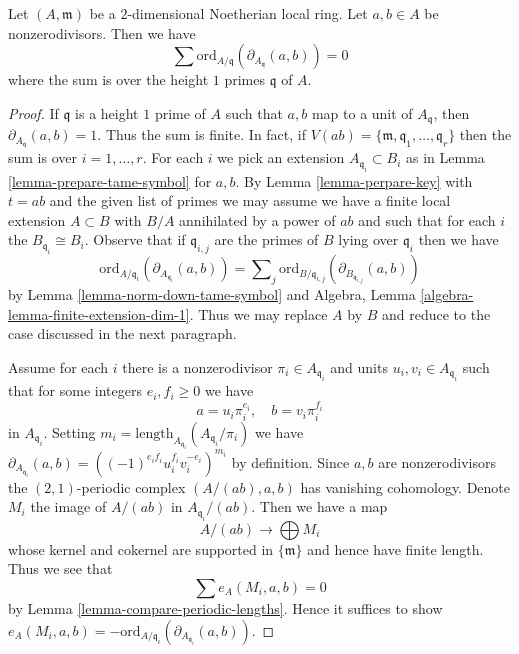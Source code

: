 \begin{lemma}
\label{lemma-key-nonzerodivisors}
Let $(A, \mathfrak m)$ be a $2$-dimensional Noetherian local ring.
Let $a, b \in A$ be nonzerodivisors.
Then we have
$$
\sum
\text{ord}_{A/\mathfrak q}(\partial_{A_{\mathfrak q}}(a, b))
=
0
$$
where the sum is over the height $1$ primes $\mathfrak q$ of $A$.
\end{lemma}

\begin{proof}
If $\mathfrak q$ is a height $1$ prime of $A$ such that $a, b$
map to a unit of $A_\mathfrak q$, then $\partial_{A_\mathfrak q}(a, b) = 1$.
Thus the sum is finite. In fact, if
$V(ab) = \{\mathfrak m, \mathfrak q_1, \ldots, \mathfrak q_r\}$
then the sum is over $i = 1, \ldots, r$.
For each $i$ we pick an extension $A_{\mathfrak q_i} \subset B_i$
as in Lemma \ref{lemma-prepare-tame-symbol} for $a, b$.
By Lemma \ref{lemma-perpare-key} with $t = ab$ and the given list of primes
we may assume we have a finite local extension $A \subset B$
with $B/A$ annihilated by a power of $ab$ and such that
for each $i$ the $B_{\mathfrak q_i} \cong B_i$.
Observe that if $\mathfrak q_{i, j}$ are the primes of $B$
lying over $\mathfrak q_i$ then we have
$$
\text{ord}_{A/\mathfrak q_i}(\partial_{A_{\mathfrak q_i}}(a, b))
=
\sum\nolimits_j
\text{ord}_{B/\mathfrak q_{i, j}}(\partial_{B_{\mathfrak q_{i, j}}}(a, b))
$$
by Lemma \ref{lemma-norm-down-tame-symbol} and
Algebra, Lemma \ref{algebra-lemma-finite-extension-dim-1}.
Thus we may replace $A$ by $B$ and
reduce to the case discussed in the next paragraph.

\medskip\noindent
Assume for each $i$ there is a nonzerodivisor
$\pi_i \in A_{\mathfrak q_i}$ and units $u_i, v_i \in A_{\mathfrak q_i}$
such that for some integers $e_i, f_i \geq 0$ we have
$$
a = u_i \pi_i^{e_i},\quad b = v_i \pi_i^{f_i}
$$
in $A_{\mathfrak q_i}$. Setting
$m_i = \text{length}_{A_{\mathfrak q_i}}(A_{\mathfrak q_i}/\pi_i)$
we have
$\partial_{A_{\mathfrak q_i}}(a, b) =
((-1)^{e_if_i}u_i^{f_i}v_i^{-e_i})^{m_i}$ by definition.
Since $a, b$ are nonzerodivisors the
$(2, 1)$-periodic complex $(A/(ab), a, b)$ has vanishing cohomology.
Denote $M_i$ the image of $A/(ab)$ in $A_{\mathfrak q_i}/(ab)$.
Then we have a map
$$
A/(ab) \longrightarrow \bigoplus M_i
$$
whose kernel and cokernel are supported in $\{\mathfrak m\}$
and hence have finite length. Thus we see that
$$
\sum e_A(M_i, a, b) = 0
$$
by Lemma \ref{lemma-compare-periodic-lengths}. Hence it suffices to show
$e_A(M_i, a, b) =
- \text{ord}_{A/\mathfrak q_i}(\partial_{A_{\mathfrak q_i}}(a, b))$.


\end{proof}
